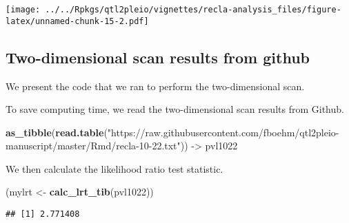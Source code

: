 \documentclass[oneside]{book}
\newenvironment{Shaded}{\begin{snugshade}}{\end{snugshade}}
\newcommand{\DataTypeTok}[1]{\textcolor[rgb]{0.13,0.29,0.53}{#1}}
\newcommand{\DecValTok}[1]{\textcolor[rgb]{0.00,0.00,0.81}{#1}}
\newcommand{\KeywordTok}[1]{\textcolor[rgb]{0.13,0.29,0.53}{\textbf{#1}}}
\newcommand{\NormalTok}[1]{#1}
\newcommand{\OperatorTok}[1]{\textcolor[rgb]{0.81,0.36,0.00}{\textbf{#1}}}
\newcommand{\StringTok}[1]{\textcolor[rgb]{0.31,0.60,0.02}{#1}}
\begin{document}
\texttt{[image: ../../Rpkgs/qtl2pleio/vignettes/recla-analysis\_files/figure-latex/unnamed-chunk-15-2.pdf]}

\hypertarget{two-dimensional-scan-results-from-github}{%
\subsection{Two-dimensional scan results from
github}\label{two-dimensional-scan-results-from-github}}

We present the code that we ran to perform the two-dimensional scan.

\begin{Shaded}
\end{Shaded}

To save computing time, we read the two-dimensional scan results from
Github.

\begin{Shaded}
\begin{Highlighting}[]
\KeywordTok{as_tibble}\NormalTok{(}\KeywordTok{read.table}\NormalTok{(}\StringTok{"https://raw.githubusercontent.com/fboehm/qtl2pleio-manuscript/master/Rmd/recla-10-22.txt"}\NormalTok{)) ->}\StringTok{ }\NormalTok{pvl1022}
\end{Highlighting}
\end{Shaded}

We then calculate the likelihood ratio test statistic.

\begin{Shaded}
\begin{Highlighting}[]
\NormalTok{(mylrt <-}\StringTok{ }\KeywordTok{calc_lrt_tib}\NormalTok{(pvl1022))}
\end{Highlighting}
\end{Shaded}

\begin{verbatim}
## [1] 2.771408
\end{verbatim}
\end{document}

